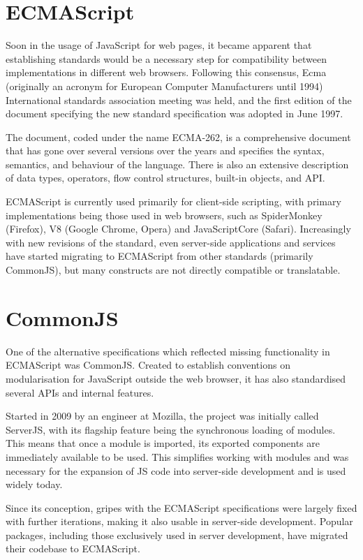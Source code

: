 \section{ECMAScript}
Soon in the usage of JavaScript for web pages, it became apparent that establishing standards would be a necessary step for compatibility between implementations in different web browsers. Following this consensus, Ecma (originally an acronym for European Computer Manufacturers until 1994) International standards association meeting was held, and the first edition of the document specifying the new standard specification was adopted in June 1997.\par
The document, coded under the name ECMA-262, is a comprehensive document that has gone over several versions over the years and specifies the syntax, semantics, and behaviour of the language. There is also an extensive description of data types, operators, flow control structures, built-in objects, and API.\par
ECMAScript is currently used primarily for client-side scripting, with primary implementations being those used in web browsers, such as SpiderMonkey (Firefox), V8 (Google Chrome, Opera) and JavaScriptCore (Safari). Increasingly with new revisions of the standard, even server-side applications and services have started migrating to ECMAScript from other standards (primarily CommonJS), but many constructs are not directly compatible or translatable.\par

\section{CommonJS}
One of the alternative specifications which reflected missing functionality in ECMAScript was CommonJS. Created to establish conventions on modularisation for JavaScript outside the web browser, it has also standardised several APIs and internal features. \par
Started in 2009 by an engineer at Mozilla, the project was initially called ServerJS, with its flagship feature being the synchronous loading of modules. This means that once a module is imported, its exported components are immediately available to be used. This simplifies working with modules and was necessary for the expansion of JS code into server-side development and is used widely today. \par
Since its conception, gripes with the ECMAScript specifications were largely fixed with further iterations, making it also usable in server-side development. Popular packages, including those exclusively used in server development, have migrated their codebase to ECMAScript.\par

